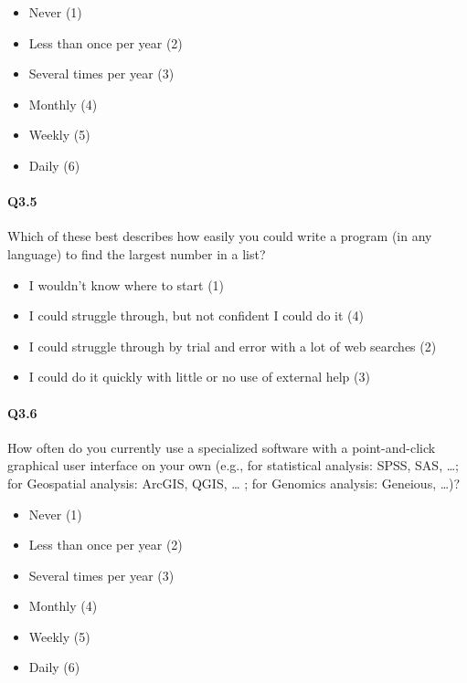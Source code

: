 \documentclass[020-persona\_validation.tex]{subfiles}
\begin{document}
            \begin{itemize}
                \item Never  (1)
                \item Less than once per year  (2)
                \item Several times per year  (3)
                \item Monthly  (4)
                \item Weekly  (5)
                \item Daily  (6)
            \end{itemize}

        \paragraph{Q3.5}

            Which of these best describes how easily you could write a program (in any language) to find the largest number in a list?

            \begin{itemize}
                \item I wouldn’t know where to start  (1)
                \item I could struggle through, but not confident I could do it  (4)
                \item I could struggle through by trial and error with a lot of web searches  (2)
                \item I could do it quickly with little or no use of external help  (3)
            \end{itemize}

        \paragraph{Q3.6}

            How often do you currently use a specialized software with a point-and-click graphical user interface on your own
            (e.g., for statistical analysis: SPSS, SAS, …; for Geospatial analysis: ArcGIS, QGIS, … ; for Genomics analysis: Geneious, …)?

            \begin{itemize}
                \item Never  (1)
                \item Less than once per year  (2)
                \item Several times per year  (3)
                \item Monthly  (4)
                \item Weekly  (5)
                \item Daily  (6)
            \end{itemize}
\end{document}
